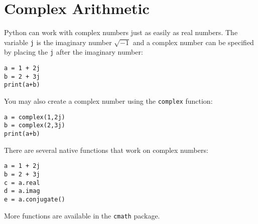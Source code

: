 \section{Complex Arithmetic}
Python can work with complex numbers just as easily as real numbers.
The variable \texttt{j} is the imaginary number $\sqrt{-1}$ and a
complex number can be specified by placing the \texttt{j} after the
imaginary number:
\begin{Verbatim}
a = 1 + 2j
b = 2 + 3j
print(a+b)
\end{Verbatim}
You may also create a complex number using the \texttt{complex}
function:
\begin{Verbatim}
a = complex(1,2j)
b = complex(2,3j)
print(a+b)
\end{Verbatim}
There are several native functions that work on complex numbers:
\begin{Verbatim}
a = 1 + 2j
b = 2 + 3j
c = a.real
d = a.imag
e = a.conjugate()
\end{Verbatim}
More functions are available in the \texttt{cmath} package.
